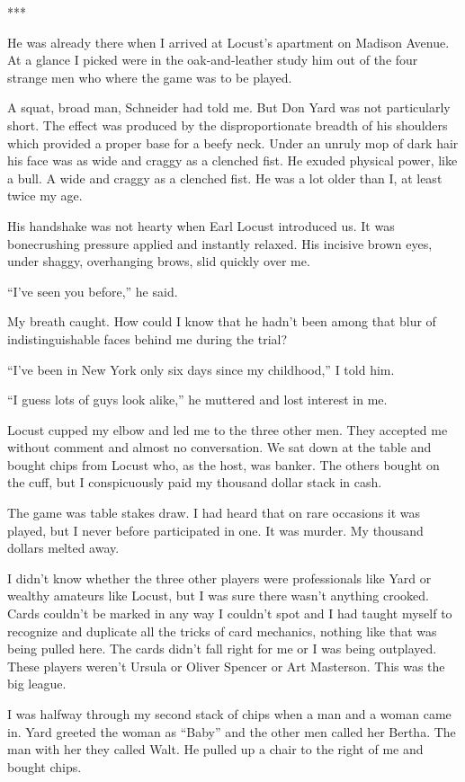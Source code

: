 \documentclass{novel}
\begin{document}
***

He was already there when I arrived at Locust’s apartment on Madison Avenue. At a glance I picked were in the oak-and-leather study him out of the four strange men who where the game was to be played.

A squat, broad man, Schneider had told me. But Don Yard was not particularly short. The effect was produced by the disproportionate breadth of his shoulders which provided a proper base for a beefy neck. Under an unruly mop of dark hair his face was as wide and craggy as a clenched fist. He exuded physical power, like a bull. A wide and craggy as a clenched fist. He was a lot older than I, at least twice my age.

His handshake was not hearty when Earl Locust introduced us. It was bonecrushing pressure applied and instantly relaxed. His incisive brown eyes, under shaggy, overhanging brows, slid quickly over me.

“I’ve seen you before,” he said.

My breath caught. How could I know that he hadn’t been among that blur of indistinguishable faces behind me during the trial?

“I’ve been in New York only six days since my childhood,” I told him.

“I guess lots of guys look alike,” he muttered and lost interest in me.

Locust cupped my elbow and led me to the three other men. They accepted me without comment and almost no conversation. We sat down at the table and bought chips from Locust who, as the host, was banker. The others bought on the cuff, but I conspicuously paid my thousand dollar stack in cash.

The game was table stakes draw. I had heard that on rare occasions it was played, but I never before participated in one. It was murder. My thousand dollars melted away.

I didn’t know whether the three other players were professionals like Yard or wealthy amateurs like Locust, but I was sure there wasn’t anything crooked. Cards couldn’t be marked in any way I couldn’t spot and I had taught myself to recognize and duplicate all the tricks of card mechanics, nothing like that was being pulled here. The cards didn’t fall right for me or I was being outplayed. These players weren’t Ursula or Oliver Spencer or Art Masterson. This was the big league.

I was halfway through my second stack of chips when a man and a woman came in. Yard greeted the woman as “Baby” and the other men called her Bertha. The man with her they called Walt. He pulled up a chair to the right of me and bought chips.
\end{document}

